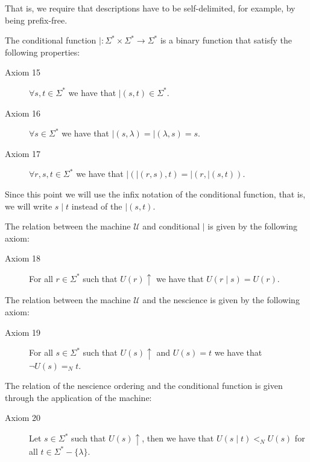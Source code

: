 That is, we require that descriptions have to be self-delimited, for example, by being prefix-free.

The conditional function $\mid : \Sigma^\ast \times \Sigma^\ast \rightarrow \Sigma^\ast$ is a binary function that satisfy the following properties:

\vskip 0.25cm

\begin{description}
\item[Axiom 15] $\forall s, t \in \Sigma^\ast$ we have that $\mid(s, t) \in \Sigma^\ast$.
\item[Axiom 16] $\forall s \in \Sigma^\ast$ we have that $\mid (s, \lambda) = \mid( \lambda, s) = s$.
\item[Axiom 17] $\forall r, s, t \in \Sigma^\ast$ we have that $\mid (\mid (r, s), t) = \mid (r, \mid (s, t))$.
\end{description}

Since this point we will use the infix notation of the conditional function, that is, we will write $s \mid t$ instead of the $\mid (s, t)$.

The relation between the machine $\mathcal{U}$ and conditional $\mid$ is given by the following axiom:

\vskip 0.25cm

\begin{description}
\item[Axiom 18] For all $r \in \Sigma^\ast$ such that $U(r) \uparrow$ we have that $U(r \mid s) = U(r)$.
\end{description}

\vskip 0.25cm

The relation between the machine $\mathcal{U}$ and the nescience is given by the following axiom:

\begin{description}
\item[Axiom 19] For all $s \in \Sigma^\ast$ such that $U(s) \uparrow$ and $U(s) = t$ we have that $\lnot U(s) =_N t$.
\end{description}

\vskip 0.25cm

The relation of the nescience ordering and the conditional function is given through the application of the machine:

\begin{description}
\item[Axiom 20] Let $s \in \Sigma^\ast$ such that $U(s) \uparrow$, then we have that $U(s \mid t) <_N U(s)$ for all $t \in \Sigma^\ast-\{\lambda\}$.
\end{description}

